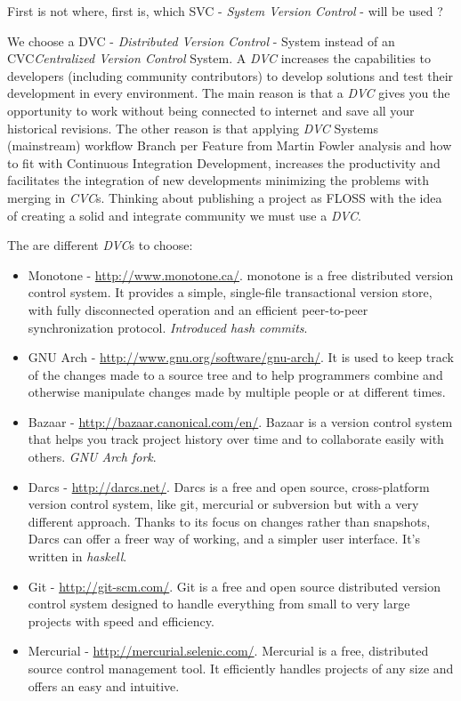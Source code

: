 \documentclass[11pt]{scrartcl}
\begin{document}
\par First is not where, first is, which SVC - \emph{System Version Control} - will be used ?

\par We choose a DVC - \emph{Distributed Version Control} - System instead of an CVC\emph{Centralized Version Control} System. A \emph{DVC} increases the capabilities to developers (including community contributors) to develop solutions and test their development in every environment. The main reason is that a \emph{DVC} gives you the opportunity to work without being connected to internet and save all your historical revisions. The other reason is that applying \emph{DVC} Systems (mainstream) workflow Branch per Feature from Martin Fowler analysis\cite{branch-per-feature} and how to fit with Continuous Integration Development, increases the productivity and facilitates the integration of new developments minimizing the problems with merging in \emph{CVC}s. Thinking about publishing a project as FLOSS with the idea of creating a solid and integrate community we must use a \emph{DVC}.

\par The are different \emph{DVC}s to choose:
\begin{itemize}
    \item Monotone - \url{http://www.monotone.ca/}. monotone is a free distributed version control system. It provides a simple, single-file transactional version store, with fully disconnected operation and an efficient peer-to-peer synchronization protocol. \emph{Introduced hash commits}.
	\item GNU Arch - \url{http://www.gnu.org/software/gnu-arch/}. It is used to keep track of the changes made to a source tree and to help programmers combine and otherwise manipulate changes made by multiple people or at different times.
	\item Bazaar - \url{http://bazaar.canonical.com/en/}. Bazaar is a version control system that helps you track project history over time and to collaborate easily with others. \emph{GNU Arch fork}.
	\item Darcs - \url{http://darcs.net/}. Darcs is a free and open source, cross-platform version control system, like git, mercurial or subversion but with a very different approach. Thanks to its focus on changes rather than snapshots, Darcs can offer a freer way of working, and a simpler user interface. It's written in \emph{haskell}.
	\item Git - \url{http://git-scm.com/}. Git is a free and open source distributed version control system designed to handle everything from small to very large projects with speed and efficiency.
	\item Mercurial - \url{http://mercurial.selenic.com/}. Mercurial is a free, distributed source control management tool. It efficiently handles projects of any size and offers an easy and intuitive. 
\end{itemize}
\end{document}
